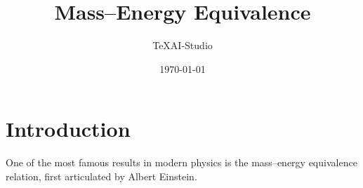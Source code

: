\documentclass{article}
\title{Mass--Energy Equivalence}
\author{TeXAI-Studio}
\date{\today}
\begin{document}
\maketitle

\section{Introduction}
One of the most famous results in modern physics is the
mass--energy equivalence relation, first articulated by
Albert Einstein.


\end{document}
